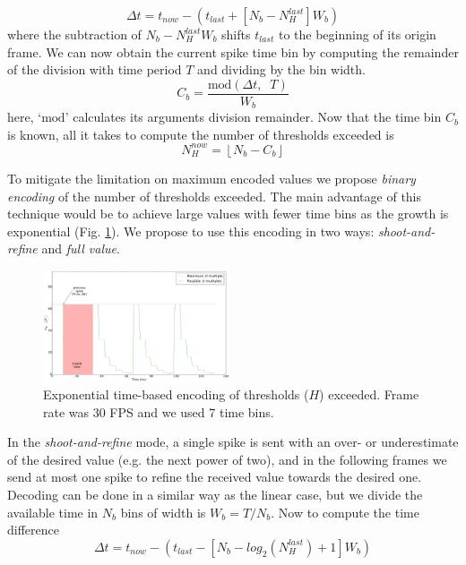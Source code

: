 \documentclass[conference]{IEEEtran}
\begin{document}
\begin{equation}
\Delta t = t_{now} -  \left(t_{last} + \left[N_{b} - N_{H}^{last}\right]W_{b}\right)
\label{eq:time_diff}
\end{equation}
where the subtraction of $N_{b} - N_{H}^{last}W_{b}$ shifts $t_{last}$ to the beginning of its origin frame. We can now obtain the current spike time bin by computing the remainder of the division with time period $T$ and dividing by the bin width.
\begin{equation}
C_{b} = \frac{\mathrm{mod}\left(\Delta t, \;\; T\right)}{W_{b}}
\label{eq:bin_compute}
\end{equation}
here, `$\mathrm{mod}$' calculates its arguments division remainder. Now that the time bin $C_{b}$ is known, all it takes to compute the number of thresholds exceeded is
\begin{equation}
 N_{H}^{now} = \left\lfloor N_{b} - C_{b} \right\rfloor
 \label{eq:new_Nh_linear}
\end{equation}

To mitigate the limitation on maximum encoded values  we propose \textit{binary encoding} of the number of thresholds exceeded. The main advantage of this technique would be to achieve large values with fewer time bins as the growth is exponential (Fig. \ref{fig:exponential_time}). We propose to use this encoding in two ways: \textit{shoot-and-refine} and \textit{full value}. 

\begin{figure}[htb]
  \centering
  \includegraphics[width=0.49\textwidth]{spike_values_exp}

  \caption{Exponential time-based encoding of thresholds ($H$) exceeded. Frame rate was 30 FPS and we used 7 time bins. }
  \label{fig:exponential_time}
\end{figure} 

In the \textit{shoot-and-refine} mode, a single spike is sent with an over- or underestimate of the desired value (e.g. the next power of two), and in the following frames we send at most one spike to refine the received value towards the desired one. Decoding can be done in a similar way as the linear case, but we divide the available time in $N_{b}$ bins of width is $W_{b} = T/N_{b}$. Now to compute the time difference
\begin{equation}
\Delta t = t_{now} - \left( t_{last} - 
                            \left[N_{b} - log_{2}(N_{H}^{last}) + 1\right]W_{b}
                     \right)
\label{eq:time_diff_exp}
\end{equation}
\end{document}
